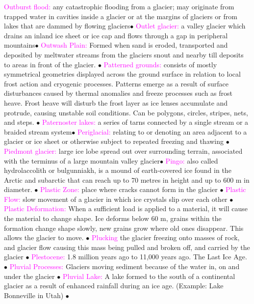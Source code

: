 \documentclass{article}
\newcommand{\ddd}{$\bullet$}
\newcommand{\pink}[1]{\textcolor{magenta}{#1}}
\newcommand{\vocab}[1]{{\pink{#1}}}
\begin{document}
\begin{multicols*}{4}
		\vocab{        Outburst flood: } any catastrophic flooding from a glacier; may originate from trapped water in cavities inside a glacier or at the margins of glaciers or from lakes that are dammed by flowing glaciers\ddd
		\vocab{        Outlet glacier: } a valley glacier which drains an inland ice sheet or ice cap and flows through a gap in peripheral mountains\ddd
		\vocab{Outwash Plain: } Formed when sand is eroded, transported and deposited by meltwater streams from the glaciers snout and nearby till deposits to areas in front of the glacier. \ddd
		\vocab{        Patterned grounds: } consists of mostly symmetrical geometries displayed across the ground surface in relation to local frost action and cryogenic processes. Patterns emerge as a result of surface disturbances caused by thermal anomalies and freeze processes such as frost heave. Frost heave will disturb the frost layer as ice lenses accumulate and protrude, causing unstable soil conditions. Can be polygons, circles, stripes, nets, and steps. \ddd
		\vocab{        Paternoster lakes: } a series of tarns connected by a single stream or a braided stream system\ddd
		\vocab{        Periglacial: } relating to or denoting an area adjacent to a glacier or ice sheet or otherwise subject to repeated freezing and thawing \ddd        
		\vocab{        Piedmont glacier: } large ice lobe spread out over surrounding terrain, associated with the terminus of a large mountain valley glacier\ddd
		\vocab{        Pingo: } also called hydrolaccolith or bulgunniakh, is a mound of earth-covered ice found in the Arctic and subarctic that can reach up to 70 metres in height and up to 600 m in diameter. \ddd       
		\vocab{Plastic Zone: } place where cracks cannot form in the glacier \ddd
		\vocab{Plastic Flow: } slow movement of a glacier in which ice crystals slip over each other \ddd
		\vocab{Plastic Deformation: } When a sufficient load is applied to a material, it will cause the material to change shape. Ice deforms below 60 m, grains within the formation change shape slowly, new grains grow where old ones disappear. This allows the glacier to move. \ddd
		\vocab{Plucking} the glacier freezing onto masses of rock, and glacier flow causing this mass being pulled and broken off, and carried by the glacier \ddd
		\vocab{Plestocene: } 1.8 million years ago to 11,000 years ago. The Last Ice Age.  \ddd
		\vocab{Pluvial Processes: } Glaciers moving sediment because of the water in, on and under the glacier \ddd
		\vocab{Pluvial Lake: } A lake formed to the south of a continental glacier as a result of enhanced rainfall during an ice age. (Example: Lake Bonneville in Utah) \ddd

\end{multicols*}
\end{document}

